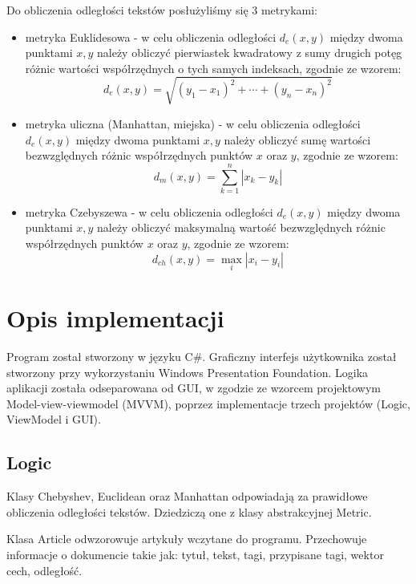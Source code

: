 \documentclass{classrep}
\begin{document}
Do obliczenia odległości tekstów posłużyliśmy się 3 metrykami: \newline

\begin{itemize}
\item metryka Euklidesowa - w celu obliczenia odległości $ d_{e}(x,y) $ między dwoma punktami $ x, y $ należy obliczyć pierwiastek kwadratowy z sumy drugich potęg różnic wartości współrzędnych o tych samych indeksach, zgodnie ze wzorem:
$$
d_{e}(x,y)= \sqrt{ (y_{1} - x_{1})^2 + \cdots + (y_{n} - x_{n})^2 }
$$

\item metryka uliczna (Manhattan, miejska) - w celu obliczenia odległości $ d_{e}(x,y) $ między dwoma punktami $ x, y $ należy obliczyć sumę wartości bezwzględnych różnic współrzędnych punktów $ x $ oraz $ y $, zgodnie ze wzorem:
$$
d_{m}(x,y)= \sum_{k=1}^{n} | x_{k} - y_{k} |
$$

\item metryka Czebyszewa - w celu obliczenia odległości $ d_{e}(x,y) $ między dwoma punktami $ x, y $ należy obliczyć maksymalną wartość bezwzględnych różnic współrzędnych punktów $ x $ oraz $ y $, zgodnie ze wzorem:
$$
d_{ch}(x,y)= \max_{i} |x_{i} - y_{i}|
$$
\newline
\end{itemize}

\section{Opis implementacji}
Program został stworzony w języku C\#. Graficzny interfejs użytkownika został stworzony przy  wykorzystaniu Windows Presentation Foundation. Logika aplikacji została odseparowana od GUI, w zgodzie ze wzorcem projektowym Model-view-viewmodel (MVVM), poprzez implementacje trzech projektów (Logic, ViewModel i GUI).

\subsection{Logic}
Klasy Chebyshev, Euclidean oraz Manhattan odpowiadają za prawidłowe obliczenia odległości tekstów. Dziedziczą one z klasy abstrakcyjnej Metric. \newline

Klasa Article odwzorowuje artykuły wczytane do programu. Przechowuje informacje o dokumencie takie jak: tytuł, tekst, tagi, przypisane tagi, wektor cech, odległość. \newline
\end{document}
